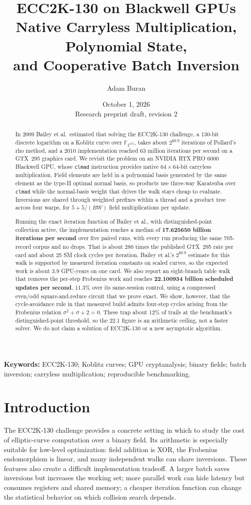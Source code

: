 \documentclass[11pt,a4paper]{article}
\title{\textbf{ECC2K-130 on Blackwell GPUs}\\[0.45em]
  \large Native Carryless Multiplication, Polynomial State,\\and Cooperative Batch Inversion}
\author{Adam Buran}
\date{October 1, 2026\\[0.2em]\small Research preprint draft, revision 2}
\newcommand{\F}{\mathbb{F}}
\newcommand{\code}[1]{\texttt{\small #1}}
\begin{document}
\maketitle
\begin{abstract}
In 2009 Bailey et al.\ estimated that solving the ECC2K-130 challenge, a 130-bit discrete logarithm on a Koblitz curve over $\F_{2^{131}}$, takes about $2^{60.9}$ iterations of Pollard's rho method, and a 2010 implementation reached 63 million iterations per second on a GTX~295 graphics card. We revisit the problem on an NVIDIA RTX PRO 6000 Blackwell GPU, whose \code{clmad} instruction provides native $64\times64$-bit carryless multiplication. Field elements are held in a polynomial basis generated by the same element as the type-II optimal normal basis, so products use three-way Karatsuba over \code{clmad} while the normal-basis weight that drives the walk stays cheap to evaluate. Inversions are shared through weighted prefixes within a thread and a product tree across four warps, for $5+5/(BW)$ field multiplications per update.

Running the exact iteration function of Bailey et al., with distinguished-point collection active, the implementation reaches a median of \textbf{17.625650 billion iterations per second} over five paired runs, with every run producing the same 705-record corpus and no drops. That is about 280 times the published GTX~295 rate per card and about 25 SM clock cycles per iteration. Bailey et al.'s $2^{60.9}$ estimate for this walk is supported by measured iteration constants on scaled curves, so the expected work is about 3.9 GPU-years on one card. We also report an eight-branch table walk that removes the per-step Frobenius work and reaches \textbf{22.100934 billion scheduled updates per second}, 11.3\% over its same-session control, using a compressed even/odd square-and-reduce circuit that we prove exact. We show, however, that the cycle-avoidance rule in that measured build admits four-step cycles arising from the Frobenius relation $\sigma^2+\sigma+2=0$. These trap about 12\% of trails at the benchmark's distinguished-point threshold, so the 22.1 figure is an arithmetic ceiling, not a faster solver. We do not claim a solution of ECC2K-130 or a new asymptotic algorithm.
\end{abstract}
\noindent\textbf{Keywords:} ECC2K-130; Koblitz curves; GPU cryptanalysis; binary fields; batch inversion; carryless multiplication; reproducible benchmarking.

\section{Introduction}
The ECC2K-130 challenge provides a concrete setting in which to study the cost of elliptic-curve computation over a binary field. Its arithmetic is especially suitable for low-level optimization: field addition is XOR, the Frobenius endomorphism is linear, and many independent walks can share inversions. These features also create a difficult implementation tradeoff. A larger batch saves inversions but increases the working set; more parallel work can hide latency but consumes registers and shared memory; a cheaper iteration function can change the statistical behavior on which collision search depends.
\end{document}
